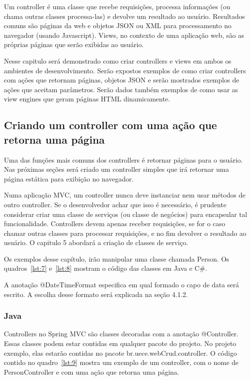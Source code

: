 \documentclass[a4paper,12pt]{article}
\newcommand{\javacode}[3] {
	
}
\newcommand{\sharpcode}[3] {
	
}
\begin{document}
Um controller é uma classe que  recebe requisições, processa informações (ou chama outras classes processa-las) e devolve um resultado ao usuário. Resultados comuns são páginas da web e objetos JSON ou XML para processamento no navegador (usando Javascript). Views, no contexto de uma aplicação web, são as próprias páginas que serão exibidas ao usuário.

Nesse capitulo será demonstrado como criar controllers e views em ambos os ambientes de desenvolvimento. Serão expostos exemplos de como criar controllers com ações que retornam páginas, objetos JSON e serão mostrados exemplos de ações que aceitam parâmetros. Serão dados também exemplos de como usar as view engines que geram páginas HTML dinamicamente.

\subsection{Criando um controller com uma ação que retorna uma página}

Uma das funções mais comuns dos controllers é retornar páginas para o usuário. Nas próximas seções será criado um controller simples que irá retornar uma página estática para exibição no navegador.

Numa aplicação MVC, um controller nunca deve instanciar nem usar métodos de outro controller. Se o desenvolvedor achar que isso é necessário, é prudente considerar criar uma classe de serviços (ou classe de negócios) para encapsular tal funcionalidade. Controllers devem apenas receber requisições, se for o caso chamar outras classes para processar requisições, e no fim devolver o resultado ao usuário. O capitulo 5 abordará a criação de classes de serviço.

Os exemplos desse capítulo, irão manipular uma classe chamada Person. Os quadros~\ref{lst:7} e~\ref{lst:8} mostram o código das classes em Java e C\#.

\javacode{code/7.txt}{Classe Person em Java}{lst:7}

A anotação @DateTimeFormat especifica em qual formado o capo de data será escrito. A escolha desse formato será explicada na seção 4.1.2.

\sharpcode{code/8.txt}{Classe Person em C\#}{lst:8}

\subsubsection{Java}

Controllers no Spring MVC são classes decoradas com a anotação @Controller. Essas classes podem estar contidas em qualquer pacote do projeto. No projeto exemplo, elas estarão contidas no pacote br.uece.webCrud.controller. O código contido no quadro~\ref{lst:9} mostra um exemplo de um controller, com o nome de PersonController e com uma ação que retorna uma página.
\end{document}
